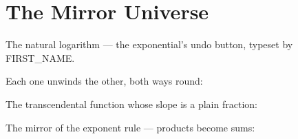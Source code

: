 
\section{The Mirror Universe}

The natural logarithm — the exponential's undo button, typeset by {{FIRST_NAME}}.

Each one unwinds the other, both ways round:



The transcendental function whose slope is a plain fraction:



The mirror of the exponent rule — products become sums:


